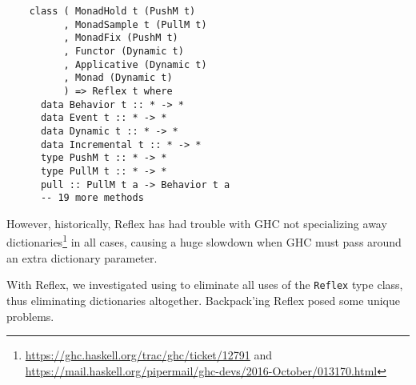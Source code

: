 \begin{lstlisting}
    class ( MonadHold t (PushM t)
          , MonadSample t (PullM t)
          , MonadFix (PushM t)
          , Functor (Dynamic t)
          , Applicative (Dynamic t)
          , Monad (Dynamic t)
          ) => Reflex t where
      data Behavior t :: * -> *
      data Event t :: * -> *
      data Dynamic t :: * -> *
      data Incremental t :: * -> *
      type PushM t :: * -> *
      type PullM t :: * -> *
      pull :: PullM t a -> Behavior t a
      -- 19 more methods
\end{lstlisting}
%
However, historically, Reflex has had trouble with GHC not
specializing away dictionaries\footnote{\url{https://ghc.haskell.org/trac/ghc/ticket/12791}
and \url{https://mail.haskell.org/pipermail/ghc-devs/2016-October/013170.html}}
in all cases, causing a huge slowdown when GHC must pass around
an extra dictionary parameter.

With Reflex, we investigated using \Backpack{} to eliminate all uses of
the \verb|Reflex| type class, thus eliminating dictionaries altogether.
Backpack'ing Reflex posed some unique problems.

